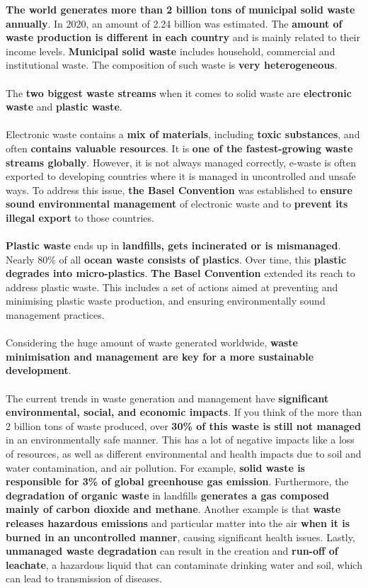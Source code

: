\documentclass[../summary.tex]{subfiles}
\begin{document}
\textbf{The world generates more than 2 billion tons of municipal solid waste annually}. In 2020, an amount of 2.24 billion was estimated. The \textbf{amount of waste production is different in each country} and is mainly related to their income levels. \textbf{Municipal solid waste} includes household, commercial and institutional waste. The composition of such waste is \textbf{very heterogeneous}.
\\\\
The \textbf{two biggest waste streams} when it comes to solid waste are \textbf{electronic waste} and \textbf{plastic waste}.
\\\\
Electronic waste contains a \textbf{mix of materials}, including \textbf{toxic substances}, and often \textbf{contains valuable resources}. It is \textbf{one of the fastest-growing waste streams globally}. However, it is not always managed correctly, e-waste is often exported to developing countries where it is managed in uncontrolled and unsafe ways. To address this issue, \textbf{the Basel Convention} was established to \textbf{ensure sound environmental management} of electronic waste and to \textbf{prevent its illegal export} to those countries.
\\\\
\textbf{Plastic waste} ends up in \textbf{landfills, gets incinerated or is mismanaged}. Nearly 80\% of all \textbf{ocean waste consists of plastics}. Over time, this \textbf{plastic degrades into micro-plastics}. \textbf{The Basel Convention} extended its reach to address plastic waste. This includes a set of actions aimed at preventing and minimising plastic waste production, and ensuring environmentally sound management practices.
\\\\
Considering the huge amount of waste generated worldwide, \textbf{waste minimisation and management are key for a more sustainable development}.
\\\\
The current trends in waste generation and management have \textbf{significant environmental, social, and economic impacts}. If you think of the more than 2 billion tons of waste produced, over \textbf{30\% of this waste is still not managed} in an environmentally safe manner. This has a lot of negative impacts like a loss of resources, as well as different environmental and health impacts due to soil and water contamination, and air pollution. For example, \textbf{solid waste is responsible for 3\% of global greenhouse gas emission}. Furthermore, the \textbf{degradation of organic waste} in landfills \textbf{generates a gas composed mainly of carbon dioxide and methane}. Another example is that \textbf{waste releases hazardous emissions} and particular matter into the air \textbf{when it is burned in an uncontrolled manner}, causing significant health issues. Lastly, \textbf{unmanaged waste degradation} can result in the creation and \textbf{run-off of leachate}, a hazardous liquid that can contaminate drinking water and soil, which can lead to transmission of diseases.
\newpage
\end{document}
